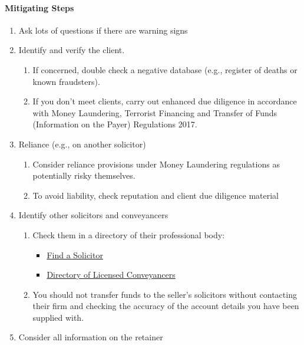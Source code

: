 \documentclass[
]{article}
\providecommand{\tightlist}{%
  \setlength{\itemsep}{0pt}\setlength{\parskip}{0pt}}
\begin{document}
\hypertarget{mitigating-steps}{%
\paragraph{Mitigating Steps}\label{mitigating-steps}}

\begin{enumerate}
\tightlist
\item
  Ask lots of questions if there are warning signs
\item
  Identify and verify the client.

  \begin{enumerate}
  \tightlist
  \item
    If concerned, double check a negative database (e.g., register of
    deaths or known fraudsters).
  \item
    If you don't meet clients, carry out enhanced due diligence in
    accordance with Money Laundering, Terrorist Financing and Transfer
    of Funds (Information on the Payer) Regulations 2017.
  \end{enumerate}
\item
  Reliance (e.g., on another solicitor)

  \begin{enumerate}
  \tightlist
  \item
    Consider reliance provisions under Money Laundering regulations as
    potentially risky themselves.
  \item
    To avoid liability, check reputation and client due diligence
    material
  \end{enumerate}
\item
  Identify other solicitors and conveyancers

  \begin{enumerate}
  \tightlist
  \item
    Check them in a directory of their professional body:

    \begin{itemize}
    \tightlist
    \item
      \href{http://solicitors.lawsociety.org.uk/}{Find a Solicitor}
    \item
      \href{http://www.conveyancer.org.uk/CLC-Consumers/Find-a-Licensed-Conveyancer.aspx}{Directory
      of Licensed Conveyancers}
    \end{itemize}
  \item
    You should not transfer funds to the seller's solicitors without
    contacting their firm and checking the accuracy of the account
    details you have been supplied with.
  \end{enumerate}
\item
  Consider all information on the retainer


\end{enumerate}
\end{document}
